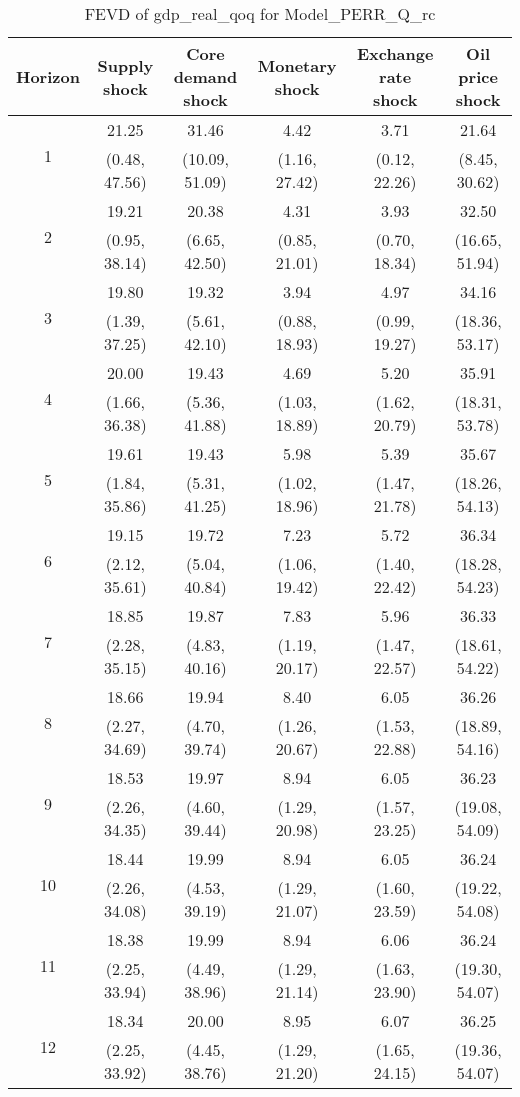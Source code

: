 \documentclass{article}
\begin{document}
\begin{table}
	\footnotesize
	\caption{FEVD of gdp_real_qoq for Model_PERR_Q_rc}
	\begin{tabular}{cccccc}
		Horizon & Supply shock & Core demand shock & Monetary shock & Exchange rate shock & Oil price shock\\ \hline
		\multirow{2}{*}{1} & 21.25 & 31.46 & 4.42 & 3.71 & 21.64\\
		 & (0.48, 47.56) & (10.09, 51.09) & (1.16, 27.42) & (0.12, 22.26) & (8.45, 30.62)\\
		\multirow{2}{*}{2} & 19.21 & 20.38 & 4.31 & 3.93 & 32.50\\
		 & (0.95, 38.14) & (6.65, 42.50) & (0.85, 21.01) & (0.70, 18.34) & (16.65, 51.94)\\
		\multirow{2}{*}{3} & 19.80 & 19.32 & 3.94 & 4.97 & 34.16\\
		 & (1.39, 37.25) & (5.61, 42.10) & (0.88, 18.93) & (0.99, 19.27) & (18.36, 53.17)\\
		\multirow{2}{*}{4} & 20.00 & 19.43 & 4.69 & 5.20 & 35.91\\
		 & (1.66, 36.38) & (5.36, 41.88) & (1.03, 18.89) & (1.62, 20.79) & (18.31, 53.78)\\
		\multirow{2}{*}{5} & 19.61 & 19.43 & 5.98 & 5.39 & 35.67\\
		 & (1.84, 35.86) & (5.31, 41.25) & (1.02, 18.96) & (1.47, 21.78) & (18.26, 54.13)\\
		\multirow{2}{*}{6} & 19.15 & 19.72 & 7.23 & 5.72 & 36.34\\
		 & (2.12, 35.61) & (5.04, 40.84) & (1.06, 19.42) & (1.40, 22.42) & (18.28, 54.23)\\
		\multirow{2}{*}{7} & 18.85 & 19.87 & 7.83 & 5.96 & 36.33\\
		 & (2.28, 35.15) & (4.83, 40.16) & (1.19, 20.17) & (1.47, 22.57) & (18.61, 54.22)\\
		\multirow{2}{*}{8} & 18.66 & 19.94 & 8.40 & 6.05 & 36.26\\
		 & (2.27, 34.69) & (4.70, 39.74) & (1.26, 20.67) & (1.53, 22.88) & (18.89, 54.16)\\
		\multirow{2}{*}{9} & 18.53 & 19.97 & 8.94 & 6.05 & 36.23\\
		 & (2.26, 34.35) & (4.60, 39.44) & (1.29, 20.98) & (1.57, 23.25) & (19.08, 54.09)\\
		\multirow{2}{*}{10} & 18.44 & 19.99 & 8.94 & 6.05 & 36.24\\
		 & (2.26, 34.08) & (4.53, 39.19) & (1.29, 21.07) & (1.60, 23.59) & (19.22, 54.08)\\
		\multirow{2}{*}{11} & 18.38 & 19.99 & 8.94 & 6.06 & 36.24\\
		 & (2.25, 33.94) & (4.49, 38.96) & (1.29, 21.14) & (1.63, 23.90) & (19.30, 54.07)\\
		\multirow{2}{*}{12} & 18.34 & 20.00 & 8.95 & 6.07 & 36.25\\
		 & (2.25, 33.92) & (4.45, 38.76) & (1.29, 21.20) & (1.65, 24.15) & (19.36, 54.07)\\
	\end{tabular}
\label{tab:fevd-Model_PERR_Q_rc-gdp_real_qoq}
\end{table}
\end{document}

